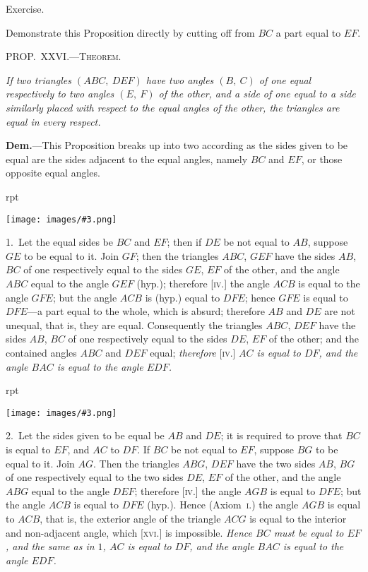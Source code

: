 \documentclass[oneside]{book}
\newcounter{wrapwidth}
\newcommand\mypropl[2]{
\bigskip\Needspace*{4\baselineskip}\begin{center}\textsc{#1}\end{center}
\hspace{\parindent}\emph{#2}\par\medskip
}
\newcommand\exhead[1]{
\Needspace*{5\baselineskip}\begin{center}
\textsf{#1}
\end{center}
}
\newcommand\imgflow[3]{
\setcounter{wrapwidth}{#1}
\begin{wrapfigure}[#2]{r}{\value{wrapwidth}pt}
\begin{center}
\vspace{-0.3in}
\texttt{[image: images/\#3.png]}
\end{center}
\end{wrapfigure}
}
\begin{document}
\exhead{Exercise.}

\begin{footnotesize}
Demonstrate this Proposition directly by cutting off from $BC$
a part equal to $EF$.
\par\end{footnotesize}


\mypropl{PROP\@.~XXVI\@.---Theorem.}{If two triangles $(ABC,\ DEF)$ have two angles $(B,\ C)$
of one equal respectively to two angles $(E,\ F)$ of the other,
and a side of one equal to a side similarly placed with
respect to the equal angles of the other, the triangles are
equal in every respect.}

\textbf{Dem.}---This Proposition breaks up into two according
as the sides given to be equal are the sides adjacent
to the equal angles, namely $BC$ and $EF$, or those
opposite equal angles.

\imgflow{140}{9}{f044}

1.~Let the equal sides be $BC$ and $EF$; then if $DE$ be
not equal to $AB$, suppose $GE$ to be equal to it. Join
$GF$; then the triangles $ABC$, $GEF$ have the sides $AB$,
$BC$ of one respectively equal to the sides $GE$, $EF$ of
the other, and the angle $ABC$ equal to the angle $GEF$
(hyp.); therefore [\textsc{iv}.] the angle $ACB$ is equal to the
angle $GFE$; but the angle
$ACB$ is (hyp.) equal to
$DFE$; hence $GFE$ is equal
to $DFE$---a part equal to
the whole, which is absurd;
therefore $AB$ and $DE$ are
not unequal, that is, they
are equal.  Consequently
the triangles $ABC$, $DEF$
have the sides $AB$, $BC$ of one respectively equal to the
sides $DE$, $EF$ of the other; and the contained angles
$ABC$ and $DEF$ equal; \emph{therefore} [\textsc{iv}.] \emph{$AC$ is equal to
$DF$, and the angle $BAC$ is equal to the angle $EDF$.}

\imgflow{160}{9}{f045}

2.~Let the sides given to be equal be $AB$ and $DE$; %
it is required to prove that
$BC$ is equal to $EF$, and
$AC$ to $DF$. If $BC$ be
not equal to $EF$, suppose
$BG$ to be equal to it.
Join $AG$. Then the triangles
$ABG$, $DEF$ have
the two sides $AB$, $BG$
of one respectively equal
to the two sides $DE$, $EF$ of the other, and the angle
$ABG$ equal to the angle $DEF$; therefore [\textsc{iv}.] the
angle $AGB$ is equal to $DFE$; but the angle $ACB$ is
equal to $DFE$ (hyp.). Hence (Axiom~\textsc{i}.) the angle
$AGB$ is equal to $ACB$, that is, the exterior angle of
the triangle $ACG$ is equal to the interior and non-adjacent
angle, which [\textsc{xvi}.] is impossible. \emph{Hence $BC$
must be equal to $EF$, and the same as in $1$, $AC$ is equal
to $DF$, and the angle $BAC$ is equal to the angle $EDF$.}\par\medskip
\end{document}

